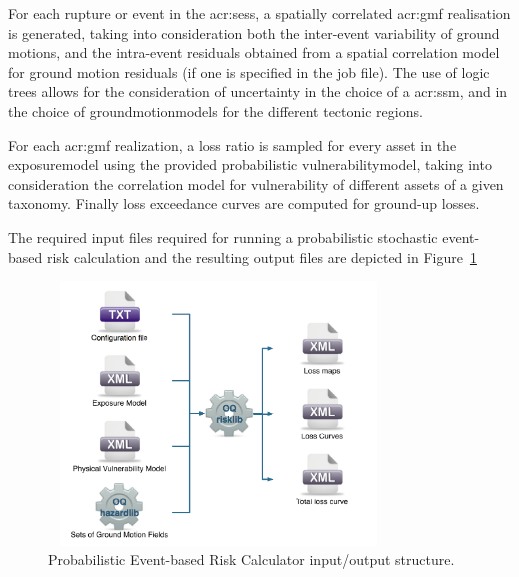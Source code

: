 For each \gls{rupture} or event in the \glspl{acr:ses}, a spatially correlated
\gls{acr:gmf} realisation is generated, taking into consideration both the
inter-event variability of ground motions, and the intra-event residuals
obtained from a spatial correlation model for ground motion residuals (if one 
is specified in the job file). The use of logic trees allows for the 
consideration of uncertainty in the choice of a \glsdesc{acr:ssm}, and in the 
choice of \glspl{groundmotionmodel} for the different tectonic regions.

For each \gls{acr:gmf} realization, a loss ratio is sampled for every
\gls{asset} in the \gls{exposuremodel} using the provided probabilistic
\gls{vulnerabilitymodel}, taking into consideration the correlation model for
vulnerability of different \glspl{asset} of a given taxonomy. Finally loss
exceedance curves are computed for ground-up losses.

The required input files required for running a probabilistic stochastic
event-based risk calculation and the resulting output files are depicted in
Figure~\ref{fig:io-structure-event-based-risk}

\begin{figure}[ht]
\centering
\includegraphics[width=9cm,height=7cm]{figures/risk/io-structure-event-based-risk.pdf}
\caption{Probabilistic Event-based Risk Calculator input/output structure.}
\label{fig:io-structure-event-based-risk}
\end{figure}
